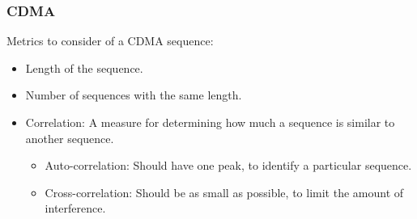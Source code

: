 \documentclass{beamer}
\begin{document}
	\begin{frame}\frametitle{CDMA}
		Metrics to consider of a CDMA sequence:

		\begin{itemize}

			\item Length of the sequence. %

			\item Number of sequences with the same length. %


			\item Correlation: A measure for determining how much a sequence is similar to another sequence.
			\begin{itemize}

				\item Auto-correlation: Should have one peak, to identify a particular sequence. %

				\item Cross-correlation: Should be as small as possible, to limit the amount of interference. %
			\end{itemize}

		\end{itemize}
	\end{frame}
\end{document}
